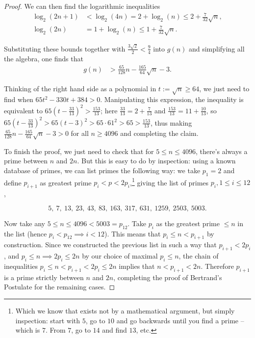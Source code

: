 \documentclass[11pt]{article}
\theoremstyle{remark}
\newcommand{\vs}{\vspace{10px}}
\begin{document}
\begin{proof}
    We can then find the logarithmic inequalities
    \begin{align*}
    \log_2(2n+1) &< \log_2(4n) = 2 + \log_2(n) \le 2 + \frac{7}{32}\sqrt{n}, \\
    \log_2(2n) &= 1 + \log_2(n) \le 1 + \frac{7}{32}\sqrt{n}.
    \end{align*}
    
    Substituting these bounds together with $\frac{3\sqrt{2}}{2} < \frac{9}{4}$ into $g(n)$ and simplifying all the algebra, one finds that
    \begin{align*}
    g(n) &> \frac{65}{128}n - \frac{165}{64}\sqrt{n} - 3.
    \end{align*}

    Thinking of the right hand side as a polynomial in $t:= \sqrt{n}\ge 64$, we just need to find when $65t^2-330t+384>0$. Manipulating this expression, the inequality is equivalent to $65\left(t-\frac{33}{13}\right)^2>\frac{153}{13}$; here $\frac{33}{13}=2+\frac{7}{13}$ and $\frac{153}{13}=11+\frac{10}{13}$, so $65(t-\frac{33}{13})^2>65(t-3)^2>65\cdot 61^2>65>\frac{153}{13}$, thus making $\frac{65}{128}n - \frac{165}{64}\sqrt{n} - 3>0$ for all $n\ge 4096$ and completing the claim.
    \vs

    To finish the proof, we just need to check that for $5\le n\le 4096$, there's always a prime between $n$ and $2n$. But this is easy to do by inspection: using a known database of primes, we can list primes the following way: we take $p_1=2$ and define $p_{i+1}$ as greatest prime $p_i<p< 2p_i$,\footnote{Which we know that exists not by a mathematical argument, but simply inspection: start with $5$, go to $10$ and go backwards until you find a prime -- which is $7$. From $7$, go to $14$ and find $13$, etc.} giving the list of primes $p_i, 1\le i\le 12$,

    $$
    5,\ 7,\ 13,\ 23,\ 43,\ 83,\ 163,\ 317,\ 631,\ 1259,\ 2503,\ 5003.
    $$

    Now take any $5\le n\le 4096<5003=p_{12}$. Take $p_i$ as the greatest prime $\le n$ in the list (hence $p_i<p_{12}\implies i<12$). This means that $p_i\le n<p_{i+1}$ by construction. Since we constructed the previous list in such a way that $p_{i+1}<2p_i $, and $ p_i\le n\implies 2p_i\le 2n$ by our choice of maximal $p_i\le n$, the chain of inequalities $p_i\le n<p_{i+1}<2p_i\le 2n$ implies that $n<p_{i+1}<2n$. Therefore $p_{i+1}$ is a prime strictly between $n$ and $2n$, completing the proof of Bertrand's Postulate for the remaining cases.
    \end{proof}




\end{document}
